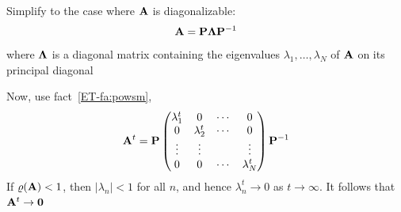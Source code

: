 \begin{frame}
    
    \vspace{2em}
    Simplify to the case where $\mathbf A$ is diagonalizable:
        $$\mathbf A = \mathbf P {\boldsymbol \Lambda} \mathbf P^{-1}$$
    where ${\boldsymbol \Lambda}$ is a diagonal
    matrix containing the eigenvalues $\lambda_1, \ldots, \lambda_N$ of $\mathbf A$
    on its principal diagonal

    \vspace{.7em}
    Now, use fact~\ref{ET-fa:powsm},
    \begin{equation*}
        \mathbf A^t
        = \mathbf P
        \left(
        \begin{matrix}
            \lambda_1^t & 0 & \cdots & 0 \\
            0 & \lambda_2^t & \cdots & 0 \\
            \vdots & \vdots &  & \vdots \\
            0 & 0 & \cdots & \lambda_N^t \\
        \end{matrix}
        \right)
        \mathbf P^{-1}
    \end{equation*}
    If $\varrho(\mathbf A) < 1$, then $|\lambda_n| < 1$ for all $n$, and hence
    $\lambda_n^t \to 0$ as $t \to \infty$. It follows that $\mathbf A^t \to
    {\mathbf 0}$ 
    
\end{frame}




